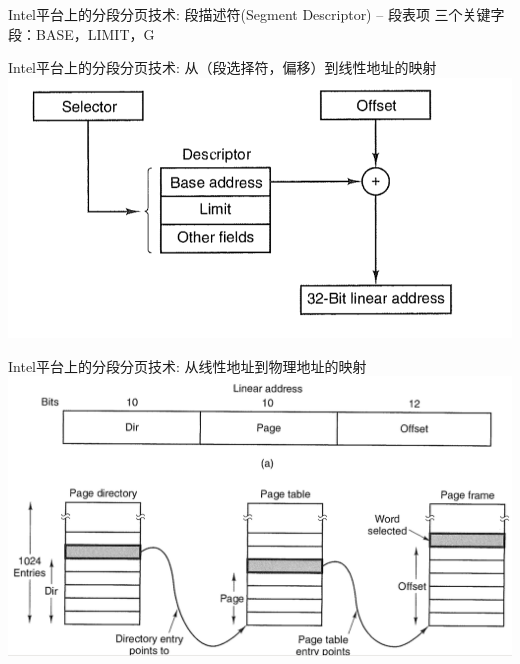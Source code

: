 \documentclass[xcolor=svgnames]{beamer}
\begin{document}
\begin{CJK*}{UTF8}{gbsn}
\begin{frame}{Intel平台上的分段分页技术: 段描述符(Segment Descriptor) -- 段表项}
三个关键字段：BASE，LIMIT，G
\end{frame}

\begin{frame}{Intel平台上的分段分页技术: 从（段选择符，偏移）到线性地址的映射}
\includegraphics[width=1.0\textwidth]{smap.png}
\end{frame}

\begin{frame}{Intel平台上的分段分页技术: 从线性地址到物理地址的映射}
\includegraphics[width=1.0\textwidth]{pmap.png}
\end{frame}

\end{CJK*}
\end{document}
